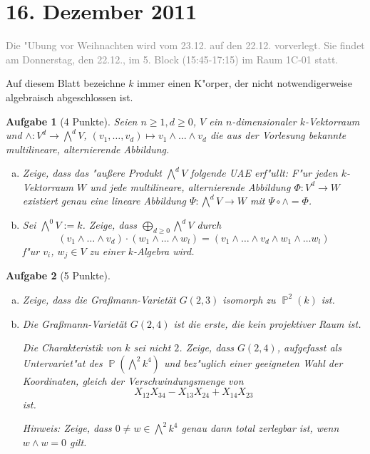 \documentclass[a4paper, 12pt, numbers=noendperiod, chapterprefix=true]{scrbook}
\theoremstyle{break}
\newtheorem{Aufg}{Aufgabe}
\theoremstyle{nonumberbreak}
\theoremstyle{nonumberplain}
\newcommand{\A}{\mathbb{A}}
\DeclareMathOperator{\Projective}{\mathbb{P}} %
\begin{document}
\newpage
\section{16. Dezember 2011}
\setcounter{Aufg}{0}
\setcounter{Loes}{2}
\textcolor{gray}{Die "Ubung vor Weihnachten wird vom 23.12. auf den 22.12. vorverlegt. Sie findet am Donnerstag, den 22.12., im 5. Block (15:45-17:15) im Raum 1C-01 statt.}

Auf diesem Blatt bezeichne $k$ immer einen K"orper, der nicht notwendigerweise algebraisch abgeschlossen ist.

\begin{Aufg}[4 Punkte]
Seien $n \geq 1, d \geq 0$, $V$ ein $n$-dimensionaler $k$-Vektorraum und $\wedge \colon V^d \to \bigwedge^dV$, $(v_1, \dots, v_d) \mapsto v_1 \wedge \dots \wedge v_d$ die aus der Vorlesung bekannte multilineare, alternierende Abbildung. 
\begin{enumerate}[a)]
	\item Zeige, dass das "au\ss ere Produkt $\bigwedge^dV$ folgende UAE erf"ullt:
	F"ur jeden $k$-Vektorraum $W$ und jede multilineare, alternierende Abbildung $\Phi\colon V^d \to W$ existiert genau eine lineare Abbildung $\Psi \colon \bigwedge^d V \to W$ mit $\Psi \circ \wedge = \Phi$.
	\item Sei $\bigwedge^0 V := k$. Zeige, dass $\bigoplus\limits_{d\geq 0} \bigwedge^d V$ durch 
		\[(v_{1} \wedge \dots \wedge v_{d}) \cdot (w_{1} \wedge \dots \wedge w_l) = (v_1 \wedge \dots \wedge v_d \wedge w_1 \wedge \dots w_l)\]
	f"ur $v_i$, $w_j \in V$ zu einer $k$-Algebra wird.
\end{enumerate}
\end{Aufg}

\begin{Aufg}[5 Punkte]
\begin{enumerate}[a)]
	\item Zeige, dass die Gra\ss mann-Variet\"at $G(2,3)$ isomorph zu $\Projective^2(k)$ ist.
	\item Die Gra\ss mann-Variet\"at $G(2,4)$ ist die erste, die kein projektiver Raum ist.

	Die Charakteristik von $k$ sei nicht $2$. Zeige, dass $G(2,4)$, aufgefasst als Untervariet"at des $\Projective(\bigwedge^2 k^4)$ und bez"uglich einer geeigneten Wahl der Koordinaten, gleich der Verschwindungsmenge von
		\[X_{12}X_{34} - X_{13}X_{24} + X_{14}X_{23}\]
	ist.
	
	\emph{Hinweis: Zeige, dass $0\neq w\in \bigwedge^2k^4$ genau dann total zerlegbar ist, wenn $w\wedge w = 0$ gilt.}
\end{enumerate}\end{Aufg}
\end{document}

